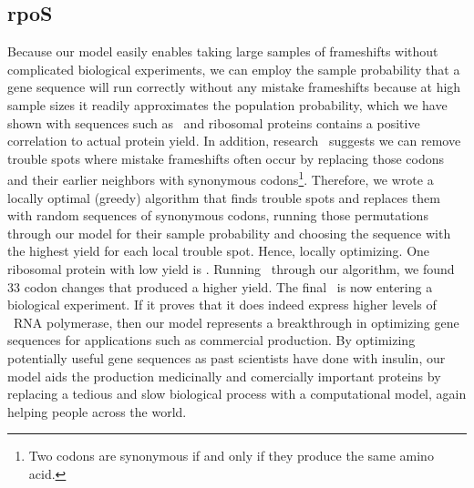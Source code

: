 \documentclass[12pt, draft]{article}
\begin{document}
\subsection{rpoS}
Because our model easily enables taking large samples of frameshifts without complicated biological experiments,
we can employ the sample probability that a gene sequence will run correctly without any mistake frameshifts because
at high sample sizes it readily approximates the population probability, which we have shown with sequences such as
\prfB\ and ribosomal proteins contains a positive correlation to actual protein yield. In addition, research~\cite{rare:yield}
suggests we can remove trouble spots where mistake frameshifts often occur by replacing those codons and their
earlier neighbors with synonymous codons\footnote{Two codons are synonymous if and only if they produce the same amino acid.}.
Therefore, we wrote a locally optimal (greedy) algorithm that finds trouble spots and replaces them with random sequences
of synonymous codons, running those permutations through our model for their sample probability and choosing the
sequence with the highest yield for each local trouble spot. Hence, locally optimizing. One ribosomal protein with
low yield is \rpoS. Running \rpoS\ through our algorithm, we found 33 codon changes that produced a higher yield.
The final \rpoS\ is now entering a biological experiment. If it proves that it does indeed express higher levels
of \rpoS\ RNA polymerase, then our model represents a breakthrough in optimizing gene sequences for applications
such as commercial production. By optimizing potentially useful gene sequences as past scientists have done with
insulin, our model aids the production medicinally and comercially important proteins by replacing a tedious and slow
biological process with a computational model, again helping people across the world.

\footnotesize
\begin{singlespace}
  
\end{singlespace}
\end{document}
